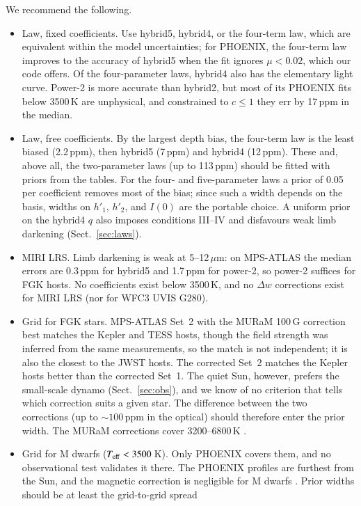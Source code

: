 \documentclass{aa}
\newcommand{\ppm}{\,\textrm{ppm}}
\newcommand{\teff}{T_{\rm eff}}
\begin{document}
We recommend the following.
\begin{itemize}
\item Law, fixed coefficients. Use hybrid5, hybrid4, or the four-term law, which are
equivalent within the model uncertainties; for PHOENIX, the four-term law
improves to the accuracy of hybrid5 when the fit ignores $\mu<0.02$, which our
code offers. Of the four-parameter laws, hybrid4 also has the elementary light
curve. Power-2 is more accurate than
hybrid2, but most of its PHOENIX fits below 3500\,K are unphysical, and
constrained to $c\le1$ they err by 17\ppm{} in the median.
\item Law, free coefficients. By the largest depth bias, the four-term law is
the least biased (2.2\ppm), then hybrid5 (7\ppm) and hybrid4 (12\ppm). These
and, above all, the two-parameter laws (up to 113\ppm) should be fitted with
priors from the tables. For the four- and five-parameter laws a prior of 0.05
per coefficient removes most of the bias; since such a width depends on the
basis, widths on $h'_1$, $h'_2$, and $I(0)$ are the portable choice. A uniform
prior on the hybrid4 $q$ also imposes conditions III--IV and disfavours weak
limb darkening (Sect.~\ref{sec:laws}).
\item MIRI LRS. Limb darkening is weak at 5--12\,$\mu$m: on MPS-ATLAS the
median errors are 0.3\ppm{} for hybrid5 and 1.7\ppm{} for power-2, so
power-2 suffices for FGK hosts. No coefficients exist below 3500\,K, and no
$\Delta w$ corrections exist for MIRI LRS (nor for WFC3 UVIS G280).
\item Grid for FGK stars. MPS-ATLAS Set~2 with the MURaM 100\,G correction
best matches the Kepler and TESS hosts, though the field strength was
inferred from the same measurements, so the match is not independent; it is
also the closest to the JWST hosts. The corrected Set~2 matches the Kepler
hosts better than the corrected Set~1. The quiet Sun, however, prefers the
small-scale dynamo (Sect.~\ref{sec:obs}), and we know of no criterion that
tells which correction suits a given star. The difference between the two
corrections (up to $\sim100\ppm$ in the optical) should therefore enter the
prior width. The MURaM corrections cover 3200--6800\,K
\citep{kostogryz2026}.
\item Grid for M dwarfs ($\teff<3500$\,K). Only PHOENIX covers them, and no
observational test validates it there. The PHOENIX profiles are furthest from
the Sun, and the magnetic correction is negligible for M dwarfs
\citep{kostogryz2026}. Prior widths should be at least the grid-to-grid spread

\end{itemize}
\end{document}
